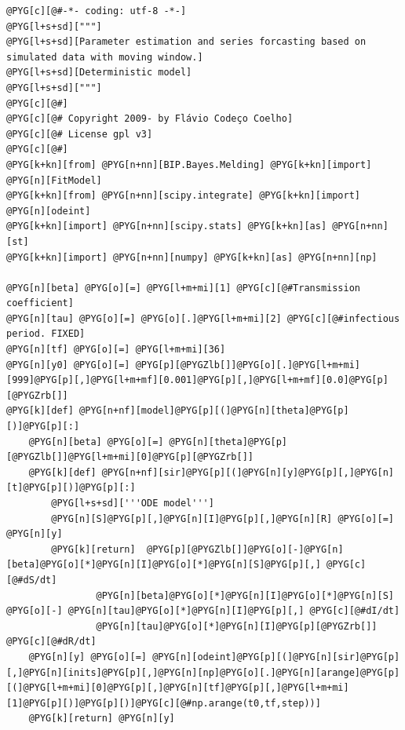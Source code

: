 \documentclass[a4paper,10pt,english]{manual}
\begin{document}
\begin{Verbatim}[commandchars=@\[\]]
@PYG[c][@#-*- coding: utf-8 -*-]
@PYG[l+s+sd]["""]
@PYG[l+s+sd][Parameter estimation and series forcasting based on simulated data with moving window.]
@PYG[l+s+sd][Deterministic model]
@PYG[l+s+sd]["""]
@PYG[c][@#]
@PYG[c][@# Copyright 2009- by Flávio Codeço Coelho]
@PYG[c][@# License gpl v3]
@PYG[c][@#]
@PYG[k+kn][from] @PYG[n+nn][BIP.Bayes.Melding] @PYG[k+kn][import] @PYG[n][FitModel]
@PYG[k+kn][from] @PYG[n+nn][scipy.integrate] @PYG[k+kn][import] @PYG[n][odeint]
@PYG[k+kn][import] @PYG[n+nn][scipy.stats] @PYG[k+kn][as] @PYG[n+nn][st]
@PYG[k+kn][import] @PYG[n+nn][numpy] @PYG[k+kn][as] @PYG[n+nn][np]

@PYG[n][beta] @PYG[o][=] @PYG[l+m+mi][1] @PYG[c][@#Transmission coefficient]
@PYG[n][tau] @PYG[o][=] @PYG[o][.]@PYG[l+m+mi][2] @PYG[c][@#infectious period. FIXED]
@PYG[n][tf] @PYG[o][=] @PYG[l+m+mi][36]
@PYG[n][y0] @PYG[o][=] @PYG[p][@PYGZlb[]]@PYG[o][.]@PYG[l+m+mi][999]@PYG[p][,]@PYG[l+m+mf][0.001]@PYG[p][,]@PYG[l+m+mf][0.0]@PYG[p][@PYGZrb[]]
@PYG[k][def] @PYG[n+nf][model]@PYG[p][(]@PYG[n][theta]@PYG[p][)]@PYG[p][:]
    @PYG[n][beta] @PYG[o][=] @PYG[n][theta]@PYG[p][@PYGZlb[]]@PYG[l+m+mi][0]@PYG[p][@PYGZrb[]]
    @PYG[k][def] @PYG[n+nf][sir]@PYG[p][(]@PYG[n][y]@PYG[p][,]@PYG[n][t]@PYG[p][)]@PYG[p][:]
        @PYG[l+s+sd]['''ODE model''']
        @PYG[n][S]@PYG[p][,]@PYG[n][I]@PYG[p][,]@PYG[n][R] @PYG[o][=] @PYG[n][y]
        @PYG[k][return]  @PYG[p][@PYGZlb[]]@PYG[o][-]@PYG[n][beta]@PYG[o][*]@PYG[n][I]@PYG[o][*]@PYG[n][S]@PYG[p][,] @PYG[c][@#dS/dt]
                @PYG[n][beta]@PYG[o][*]@PYG[n][I]@PYG[o][*]@PYG[n][S] @PYG[o][-] @PYG[n][tau]@PYG[o][*]@PYG[n][I]@PYG[p][,] @PYG[c][@#dI/dt]
                @PYG[n][tau]@PYG[o][*]@PYG[n][I]@PYG[p][@PYGZrb[]] @PYG[c][@#dR/dt]
    @PYG[n][y] @PYG[o][=] @PYG[n][odeint]@PYG[p][(]@PYG[n][sir]@PYG[p][,]@PYG[n][inits]@PYG[p][,]@PYG[n][np]@PYG[o][.]@PYG[n][arange]@PYG[p][(]@PYG[l+m+mi][0]@PYG[p][,]@PYG[n][tf]@PYG[p][,]@PYG[l+m+mi][1]@PYG[p][)]@PYG[p][)]@PYG[c][@#np.arange(t0,tf,step))]
    @PYG[k][return] @PYG[n][y]
    

\end{Verbatim}
\end{document}
